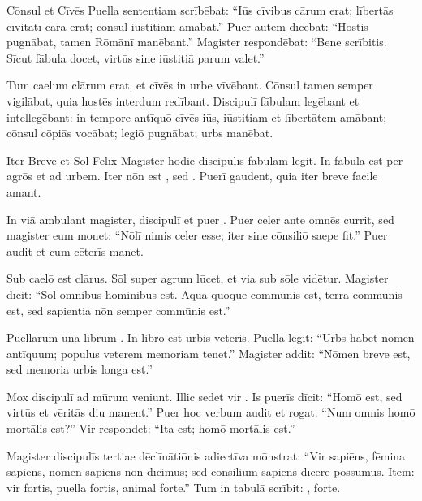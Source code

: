 \documentclass[12pt]{nextbook}
\begin{document}
\begin{readersection}{Cōnsul et Cīvēs}
Puella sententiam scrībēbat: “Iūs cīvibus cārum erat; lībertās cīvitātī cāra erat; cōnsul iūstitiam amābat.” Puer autem dīcēbat: “Hostis pugnābat, tamen Rōmānī manēbant.” Magister respondēbat: “Bene scrībitis. Sīcut fābula docet, virtūs sine iūstitiā parum valet.”

Tum caelum clārum erat, et cīvēs in urbe vīvēbant. Cōnsul tamen semper vigilābat, quia hostēs interdum redībant. Discipulī fābulam legēbant et intellegēbant: in tempore antīquō cīvēs iūs, iūstitiam et lībertātem amābant; cōnsul cōpiās vocābat; legiō pugnābat; urbs manēbat.

\end{readersection}

\begin{readersection}{Iter Breve et Sōl Fēlīx}
Magister hodiē discipulīs fābulam legit. In fābulā est  per agrōs et ad urbem. Iter nōn est , sed . Puerī gaudent, quia iter breve facile amant.

In viā ambulant magister, discipulī et puer . Puer celer ante omnēs currit, sed magister eum monet: “Nōlī nimis celer esse; iter sine cōnsiliō saepe  fit.” Puer audit et cum cēterīs manet.

Sub caelō est  clārus. Sōl super agrum lūcet, et via sub sōle vidētur. Magister dīcit: “Sōl omnibus hominibus  est. Aqua quoque commūnis est, terra commūnis est, sed sapientia nōn semper commūnis est.”

Puellārum ūna librum . In librō est  urbis veteris. Puella legit: “Urbs habet nōmen antīquum; populus veterem memoriam tenet.” Magister addit: “Nōmen breve est, sed memoria urbis longa est.”

Mox discipulī ad mūrum veniunt. Illic sedet vir . Is puerīs dīcit: “Homō  est, sed virtūs et vēritās diu manent.” Puer hoc verbum audit et rogat: “Num omnis homō mortālis est?” Vir respondet: “Ita est;  homō mortālis est.”

Magister discipulīs tertiae dēclīnātiōnis adiectīva mōnstrat: “Vir sapiēns, fēmina sapiēns, nōmen sapiēns nōn dīcimus; sed cōnsilium sapiēns dīcere possumus. Item: vir fortis, puella fortis, animal forte.” Tum in tabulā scrībit: , forte.


\end{readersection}
\end{document}
